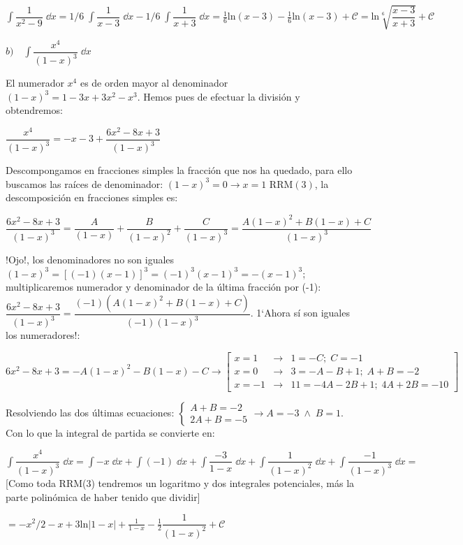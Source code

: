 {\begin{proofw}
$\displaystyle \int \dfrac {1}{x^2-9}\; \dd x= 1/6\; \int \dfrac 1 {x-3} \; \dd x - 1/6 \; \int \dfrac 1 {x+3} \; \dd x= \frac 1 6 \mathrm{ln}(x-3) - \frac 1 6 \mathrm{ln}(x-3) + \mathcal C=\mathrm{ln} \sqrt[6]{\dfrac {x-3}{x+3}} +\mathcal C$



$b) \quad \displaystyle \int \dfrac {x^4}{(1-x)^3} \; \dd x$


El numerador $x^4$ es de orden mayor al denominador $(1-x)^3=1-3x+3x^2-x^3$. Hemos pues de efectuar la división y obtendremos:

$\dfrac {x^4}{(1-x)^3}= -x-3+\dfrac {6x^2-8x+3}{(1-x)^3}$

Descompongamos en fracciones simples la fracción que nos ha quedado, para ello buscamos las raíces de denominador: $(1-x)^3=0 \to x=1 \text{ RRM}(3)$, la descomposición en fracciones simples es:

$\dfrac {6x^2-8x+3}{(1-x)^3}= \dfrac{A}{(1-x)}+ \dfrac{B}{(1-x)^2} +\dfrac{C}{(1-x)^3}=\dfrac {A(1-x)^2+B(1-x)+C}{(1-x)^3}$

!Ojo!, los denominadores no son iguales $(1-x)^3= [(-1)(x-1)]^3=(-1)^3(x-1)^3=-(x-1)^3$; multiplicaremos numerador y denominador de la última fracción por (-1):
$\displaystyle \dfrac {6x^2-8x+3}{(1-x)^3}= \dfrac {(-1)\left(A(1-x)^2+B(1-x)+C\right)}{(-1)(1-x)^3}$. 1`Ahora sí son iguales los numeradores!:

\small{$6x^2-8x+3=-A(1-x)^2-B(1-x)-C \to \left[ \begin{matrix} x=1 & \to & 1=-C; \; C=-1 \\ x=0 & \to & 3 = -A-B+1; \; A+B=-2 \\
x=-1 & \to & 11=-4A-2B+1; \; 4A+2B=-10 \end{matrix} \right] $}

\normalsize{Resolviendo} las dos últimas ecuaciones: $\begin{cases}
							A+B=-2 \\
							2A+B=-5
							\end{cases} \to A=-3 \; \wedge \; B=1$. Con lo que la integral de partida se convierte en:
							
$\displaystyle \int \dfrac {x^4}{(1-x)^3} \; \dd x = \int -x \; \dd x + \int (-1) \; \dd x + \int \dfrac {-3}{1-x} \; \dd x + \int \dfrac {1}{(1-x)^2} \; \dd x + \int \dfrac {-1}{(1-x)^3} \; \dd x =\; $ [Como toda RRM(3) tendremos un logaritmo y dos integrales potenciales, más la parte polinómica de haber tenido que dividir]

$=\displaystyle -x^2/2 -x +3 \mathrm{ln}|1-x| + \frac {1}{1-x} -\frac 1 2  \dfrac {1}{(1-x)^2} + \mathcal C  $



\end{proofw}}
